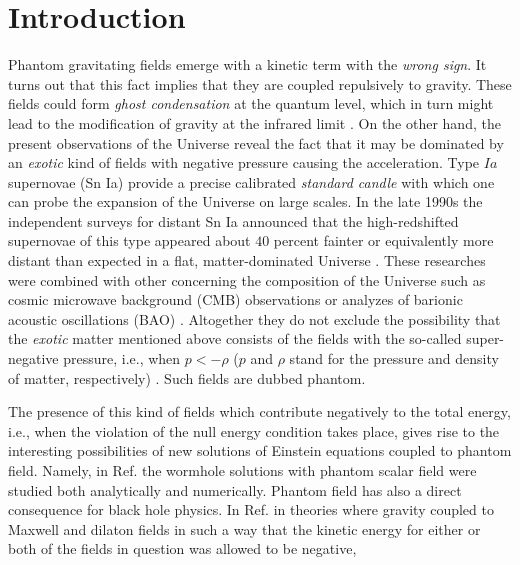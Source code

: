 \documentclass[aps,showpacs,nofootinbib,floatfix]{revtex4}
\begin{document}
\maketitle

\section{Introduction}
Phantom gravitating fields emerge with a kinetic term with the {\it wrong sign}. It turns out that this fact
implies that they are coupled repulsively to gravity. These fields could form {\it ghost condensation}
at the quantum level, which in turn might lead to the modification of gravity at the infrared limit
\cite{ark04}. On the other hand, the present observations of the Universe reveal the fact that
it may be dominated by an {\it exotic} kind of fields with negative pressure causing the acceleration.
Type $Ia$ supernovae (Sn Ia) provide a precise calibrated {\it standard candle} with which one can probe
the expansion of the Universe on large scales. In the late 1990s the independent surveys for distant
Sn Ia announced that the high-redshifted supernovae of this type appeared about $40$ percent fainter or
equivalently more distant than expected in a flat, matter-dominated Universe \cite{accuniv}.
These researches were combined with other concerning the composition of the Universe such as 
cosmic microwave background (CMB) observations \cite{ben03} or analyzes of barionic acoustic oscillations (BAO) \cite{eis05}. 
Altogether they do not exclude the possibility that the {\it exotic} matter mentioned above consists of 
the fields with the so-called super-negative pressure, i.e., when $p<-\rho$ ($p$ and $\rho$ stand for 
the pressure and density of matter, respectively) \cite{cal02}. Such fields are dubbed phantom.
\par
The presence of this kind of fields which contribute negatively to the total energy, i.e.,
when the violation of the null energy condition takes place, gives rise to the interesting possibilities
of new solutions of Einstein equations coupled to phantom field. Namely, in Ref.\cite{ell73} the wormhole
solutions with phantom scalar field were studied both analytically and numerically. Phantom field has also 
a direct consequence for black hole physics.
In Ref.\cite{gib96} in theories where gravity coupled to Maxwell and dilaton fields in such
a way that the kinetic energy for either or both of the fields in question was allowed to be negative,
\end{document}
